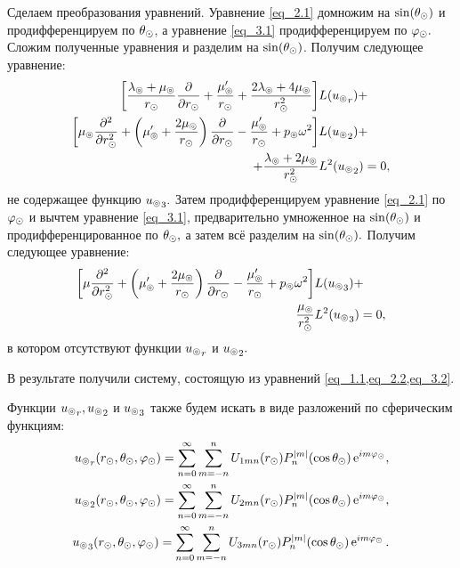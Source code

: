 Сделаем преобразования уравнений. Уравнение \cref{eq_2.1} домножим на $\sin(\theta_\odot)$ и продифференцируем по $\theta_\odot$, а уравнение \cref{eq_3.1} продифференцируем по $\varphi_\odot.$ Сложим полученные уравнения и разделим на $\sin(\theta_\odot)$. Получим следующее уравнение:
\begin{equation}\label{eq_2.2}
\begin{split}
\left[\frac{\lambda_\circledcirc+\mu_\circledcirc}{r_\odot}\frac{\partial}{\partial r_\odot} + \frac{\mu_\circledcirc'}{r_\odot} + \frac{2\lambda_\circledcirc+4\mu_\circledcirc}{r_\odot^2}\right]&L({u_\circledcirc}_r)+\\
\left[\mu_\circledcirc\frac{\partial^2}{\partial r_\odot^2} + \left(\mu_\circledcirc'+\frac{2\mu_\circledcirc}{r_\odot}\right)\frac{\partial}{\partial r_\odot} - \frac{\mu_\circledcirc'}{r_\odot} + p_\circledcirc\omega^2\right]&L({u_\circledcirc}_2) + \\
 + \frac{\lambda_\circledcirc+2\mu_\circledcirc}{r_\odot^2}&L^2({u_\circledcirc}_2) = 0,
\end{split}
\end{equation}
не содержащее функцию ${u_\circledcirc}_3.$ Затем продифференцируем уравнение \cref{eq_2.1} по $\varphi_\odot$ и вычтем уравнение \cref{eq_3.1}, предварительно умноженное на $\sin(\theta_\odot)$ и продифференцированное по $\theta_\odot,$ а затем всё разделим на $\sin(\theta_\odot).$ Получим следующее уравнение:
\begin{equation}\label{eq_3.2}
\begin{split}
\left[\mu\frac{\partial^2}{\partial r_\odot^2} + \left(\mu_\circledcirc' + \frac{2\mu_\circledcirc}{r_\odot}\right)\frac{\partial}{\partial r_\odot} - \frac{\mu_\circledcirc'}{r_\odot} + p_\circledcirc\omega^2\right]&L({u_\circledcirc}_3) + \\
\frac{\mu_\circledcirc}{r_\odot^2}&L^2({u_\circledcirc}_3) = 0,
\end{split}
\end{equation}
в котором отсутствуют функции ${u_\circledcirc}_r$ и ${u_\circledcirc}_2.$

В результате получили систему, состоящую из уравнений \cref{eq_1.1,eq_2.2,eq_3.2}.

Функции ${u_\circledcirc}_r, {u_\circledcirc}_2$ и ${u_\circledcirc}_3$ также будем искать в виде разложений по сферическим функциям:
\begin{equation}\label{eq_uru2u3}
\begin{split}
{u_\circledcirc}_r(r_\odot, \theta_\odot, \varphi_\odot) = \sum\limits_{n=0}^\infty\sum\limits_{m=-n}^n U_{1mn}(r_\odot)P_n^{\lvert m\rvert}(\cos\theta_\odot)\operatorname{e}^{im\varphi_\odot},\\
{u_\circledcirc}_2(r_\odot, \theta_\odot, \varphi_\odot) = \sum\limits_{n=0}^\infty\sum\limits_{m=-n}^n U_{2mn}(r_\odot)P_n^{\lvert m\rvert}(\cos\theta_\odot)\operatorname{e}^{im\varphi_\odot},\\
{u_\circledcirc}_3(r_\odot, \theta_\odot, \varphi_\odot) = \sum\limits_{n=0}^\infty\sum\limits_{m=-n}^n U_{3mn}(r_\odot)P_n^{\lvert m\rvert}(\cos\theta_\odot)\operatorname{e}^{im\varphi_\odot}.\\
\end{split}
\end{equation}

